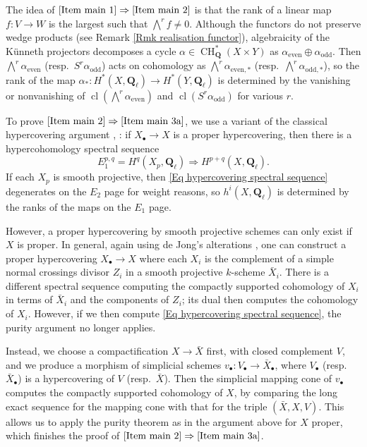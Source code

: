\documentclass[11pt]{amsart}
\theoremstyle{definition}
\newcommand{\Z}{\mathbf Z}
\newcommand{\Q}{\mathbf Q}
\newcommand{\CH}{\operatorname{CH}}
\newcommand{\cl}{\operatorname{cl}}
\newcommand{\Ra}{\Rightarrow}
\newcommand{\gVec}{\mathbf{gVec}}
\newcommand{\M}{\mathbf{Mot}}
\begin{document}
The idea of $\ref{Item main 1} \Ra \ref{Item main 2}$ is that the
rank of a linear map $f \colon V \to W$ is the largest \makebox{$r
\in \Z_{\geq 0}$} such that $\bigwedge^r f \neq 0$. Although the
functors \makebox{$H^*(-,\Q_\ell) \colon \M_k \to \gVec$} do not
preserve wedge products (see Remark \ref{Rmk realisation functor}),
algebraicity of the K\"unneth projectors \cite{KM} decomposes a
cycle $\alpha \in \CH^*_\Q(X \times Y)$ as $\alpha_{\text{even}}
\oplus \alpha_{\text{odd}}$. Then $\bigwedge^r \alpha_{\text{even}}$
(resp.~$S^r \alpha_{\text{odd}}$) acts on cohomology as $\bigwedge^r
\alpha_{\text{even},*}$ (resp.~$\bigwedge^r \alpha_{\text{odd},*}$),
so the rank of the map $\alpha_* \colon H^*(X,\Q_\ell) \to H^*(Y,\Q_\ell)$
is determined by the vanishing or nonvanishing of
$\cl(\bigwedge^r\alpha_{\text{even}})$ and $\cl(S^r
\alpha_{\text{odd}})$ for various $r$.

To prove $\ref{Item main 2} \Ra \ref{Item main 3a}$, we use a
variant of the classical hypercovering argument
\cite[exp.~V$^{\text{bis}}$]{SGA4II}, \cite[\S5,6]{Hdg3}: if
$X_\bullet \to X$ is a proper hypercovering, then there is a
hypercohomology spectral sequence
\begin{equation}
E_1^{p,q} = H^q(X_p,\Q_\ell) \Ra H^{p+q}(X,\Q_\ell).\label{Eq
hypercovering spectral sequence}
\end{equation}
If each $X_p$ is smooth projective, then \eqref{Eq hypercovering
spectral sequence} degenerates on the $E_2$ page for weight reasons,
so $h^i(X,\Q_\ell)$ is determined by the ranks of the maps on the
$E_1$ page.

However, a proper hypercovering by smooth projective schemes can
only exist if $X$ is proper. In general, again using de Jong's
alterations \cite{dJ}, one can construct a proper hypercovering
$X_\bullet \to X$ where each $X_i$ is the complement of a simple
normal crossings divisor $Z_i$ in a smooth projective $k$-scheme
$\bar X_i$. There is a different spectral sequence
\cite[p.~28--29]{Katz} computing the compactly supported cohomology
of $X_i$ in terms of $\bar X_i$ and the components of $Z_i$; its
dual then computes the cohomology of $X_i$. However, if we then
compute \eqref{Eq hypercovering spectral sequence}, the purity
argument no longer applies.

Instead, we choose a compactification $X \to \bar X$ first, with
closed complement $V$, and we produce a morphism of simplicial
schemes $v_\bullet \colon V_\bullet \to \bar X_\bullet$, where
$V_\bullet$ (resp.~$\bar X_\bullet$) is a hypercovering of $V$
(resp.~$\bar X$). Then the simplicial mapping cone of $v_\bullet$
computes the compactly supported cohomology of $X$, by comparing the
long exact sequence for the mapping cone with that for the triple
$(\bar X,X,V)$. This allows us to apply the purity theorem as in the
argument above for $X$ proper, which finishes the proof of
$\ref{Item main 2} \Ra \ref{Item main 3a}$.
\end{document}
